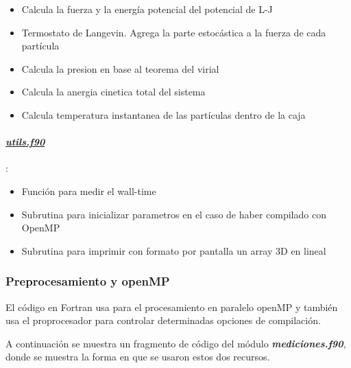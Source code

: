 \begin{itemize}
	\item Calcula la fuerza y la energía potencial del potencial de L-J

	\item Termostato de Langevin. Agrega la parte estocástica a la fuerza de cada partícula

	\item Calcula la presion en base al teorema del virial 

	\item Calcula la anergia cinetica total del sistema

	\item Calcula temperatura instantanea de las partículas dentro de la caja 
\end{itemize}

\paragraph{\underline{\textit{utils.f90}}}:

\begin{itemize}
   \item Función para medir el wall-time

 \item   Subrutina para inicializar parametros en el caso de haber compilado con OpenMP

 \item   Subrutina para imprimir con formato por pantalla un array 3D en lineal 

\end{itemize}


\subsubsection{Preprocesamiento y openMP}

El código en Fortran usa para el procesamiento en paralelo openMP y también usa el proprocesador
para controlar determinadas opciones de compilación.

A continuación se muestra un fragmento de código del módulo \textbf{\textit{mediciones.f90}}, donde
se muestra la forma en que se usaron estos dos recursos.

